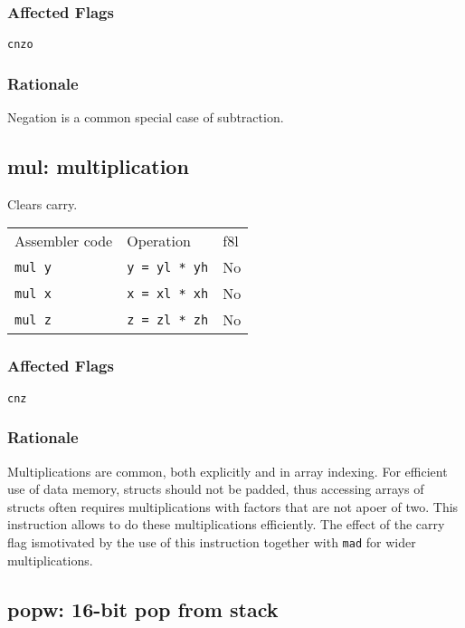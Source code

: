 \documentclass{book}
\begin{document}
\subsubsection*{Affected Flags}

\texttt{cnzo}

\subsubsection*{Rationale}

Negation is a common special case of subtraction.


\subsection{mul: multiplication}

Clears carry.

\begin{tabular}{l l l}
Assembler code & Operation            & f8l \\
\texttt{mul y} & \texttt{y = yl * yh} & No \\
\texttt{mul x} & \texttt{x = xl * xh} & No \\
\texttt{mul z} & \texttt{z = zl * zh} & No \\
\end{tabular}

\subsubsection*{Affected Flags}

\texttt{cnz}

\subsubsection*{Rationale}

Multiplications are common, both explicitly and in array indexing. For efficient use of data memory, structs should not be padded, thus accessing arrays of structs often requires multiplications with factors that are not apoer of two. This instruction allows to do these multiplications efficiently. The effect of the carry flag ismotivated by the use of this instruction together with \texttt{mad} for wider multiplications.


\subsection{popw: 16-bit pop from stack}
\end{document}

